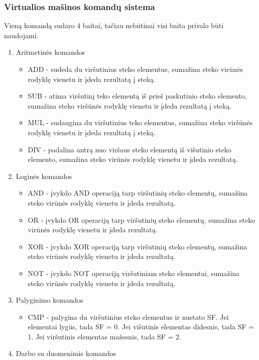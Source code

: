 	\subsubsection{Virtualios mašinos komandų sistema}
	Vieną komandą sudaro 4 baitai, tačiau nebūtinai visi baita privalo būti naudojami.
	\begin{enumerate}
	\item Aritmetinės komandos
		\begin{itemize}
		\item ADD - sudeda du viršutinius steko elementus, sumažina steko virūnės rodyklę vienetu ir įdeda rezultatą į steką.
		\item SUB - atima viršutinį teko elementą iš prieš paskutinio steko elemento, sumažina steko viršūnės rodyklę vienetu ir įdeda rezultatą į steką.
		\item MUL - sudaugina du viršutinius teko elementus, sumažina steko viršūnės rodyklę vienetu ir įdeda rezultatą į steką.
		\item DIV - padalina antrą nuo viršaus steko elementą iš višutinio steko elemento, sumažina steko virūnės rodyklę vienetu ir įdeda rezultatą.
		\end{itemize}
	\item Loginės komandos
		\begin{itemize}
		\item AND - įvykdo AND operaciją tarp viršutinių steko elementų, sumažina steko virūnės rodyklę vienetu ir įdeda rezultatą.
		\item OR - įvykdo OR operaciją tarp viršutinių steko elementų, sumažina steko virūnės rodyklę vienetu ir įdeda rezultatą.
		\item XOR - įvykdo XOR operaciją tarp viršutinių steko elementų, sumažina steko virūnės rodyklę vienetu ir įdeda rezultatą.
		\item NOT - įvykdo NOT operaciją viršutiniam steko elementui, sumažina steko virūnės rodyklę vienetu ir įdeda rezultatą.
		\end{itemize}
	\item Palyginimo komandos
		\begin{itemize}
		\item CMP - palygina du viršutinius steko elementus ir nustato SF. Jei elementai lygūs, tada SF = 0. Jei višutinis elementas didesnis, tada SF = 1. Jei viršutinis elementas mažesnis, tada SF = 2.
		\end{itemize}
	\item Darbo su duomenimis komandos
		\begin{itemize}

\end{itemize}
\end{enumerate}
